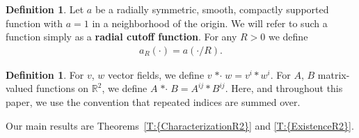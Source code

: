 \documentclass[reqno,openright,11pt,twoside]{amsart}
\theoremstyle{definition}
\newtheorem{definition}[theorem]{Definition}
\numberwithin{equation}{section}
\begin{document}
\begin{definition}\label{D:RadialCutoff}
    Let $a$ be a radially symmetric, smooth, compactly supported
    function with $a = 1$ in a neighborhood of the origin. We will
    refer to such a function simply as a \textbf{radial cutoff
    function}. For any $R > 0$ we define
    \begin{align*}
        a_R(\cdot) = a(\cdot/R).
    \end{align*}
\end{definition}

\begin{definition}\label{D:stardot}
	For $v$, $w$ vector fields, we define
	$
		v {\mathop{* \cdot}} w
			= v^i * w^i.
	$
	For $A$, $B$ matrix-valued functions on ${\ensuremath{{\ensuremath{\mathbb{{R}}}}}}^2$, we define
	$
		A {\mathop{* \cdot}} B
			= A^{ij} * B^{ij}.
	$
	Here, and throughout this paper, we use the convention that repeated
	indices are summed over.
\end{definition}

\bigskip

Our main results are {Theorems~\ref{T:{CharacterizationR2}} and \ref{T:{ExistenceR2}}}.
\end{document}
